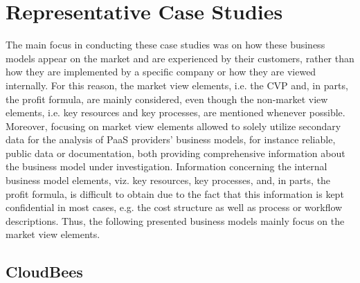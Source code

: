 
\section{Representative Case Studies}

The main focus in conducting these case studies was on how these business models appear on the market and are experienced by their customers, rather than how they are implemented by a specific company or how they are viewed internally. For this reason, the market view elements, i.e. the \ac{CVP} and, in parts, the profit formula, are mainly considered, even though the non-market view elements, i.e. key resources and key processes, are mentioned whenever possible. Moreover, focusing on market view elements allowed to solely utilize secondary data for the analysis of \ac{PaaS} providers' business models, for instance reliable, public data or documentation, both providing comprehensive information about the business model under investigation. Information concerning the internal business model elements, viz. key resources, key processes, and, in parts, the profit formula, is difficult to obtain due to the fact that this information is kept confidential in most cases, e.g. the cost structure as well as process or workflow descriptions. Thus, the following presented business models mainly focus on the market view elements.

\subsection{CloudBees}\label{ch:sota:cb}

